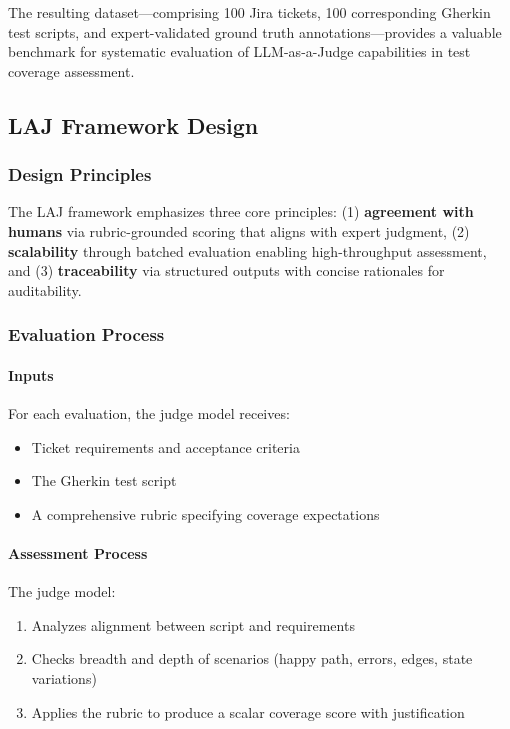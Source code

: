 \documentclass[letterpaper]{article} %
\begin{document}
The resulting dataset---comprising 100 Jira tickets, 100 corresponding Gherkin test scripts, and expert-validated ground truth annotations---provides a valuable benchmark for systematic evaluation of LLM-as-a-Judge capabilities in test coverage assessment.

\subsection{LAJ Framework Design}

\subsubsection{Design Principles}
The LAJ framework emphasizes three core principles: (1) \textbf{agreement with humans} via rubric-grounded scoring that aligns with expert judgment, (2) \textbf{scalability} through batched evaluation enabling high-throughput assessment, and (3) \textbf{traceability} via structured outputs with concise rationales for auditability.

\subsubsection{Evaluation Process}

\paragraph{Inputs}
For each evaluation, the judge model receives:
\begin{itemize}[nosep]
  \item Ticket requirements and acceptance criteria
  \item The Gherkin test script
  \item A comprehensive rubric specifying coverage expectations
\end{itemize}

\paragraph{Assessment Process}
The judge model:
\begin{enumerate}[nosep]
  \item Analyzes alignment between script and requirements
  \item Checks breadth and depth of scenarios (happy path, errors, edges, state variations)
  \item Applies the rubric to produce a scalar coverage score with justification
\end{enumerate}
\end{document}
